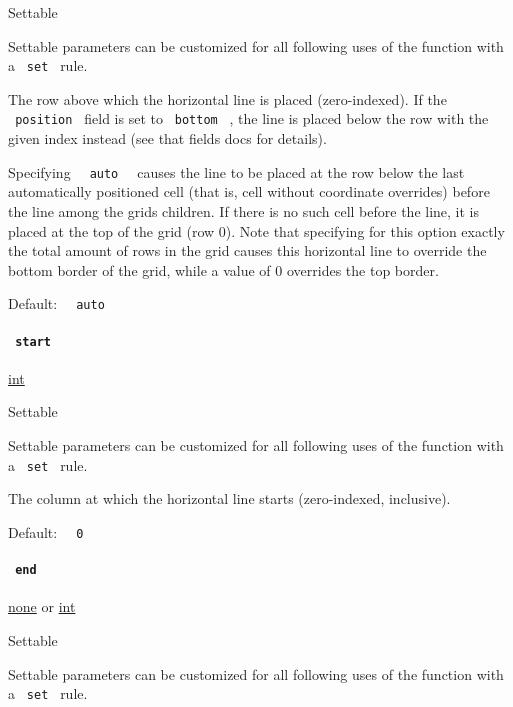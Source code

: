 {{ Settable }}

\label{definitions-hline-y-settable-tooltip}
Settable parameters can be customized for all following uses of the
function with a \texttt{\ set\ } rule.

The row above which the horizontal line is placed (zero-indexed). If the
\texttt{\ position\ } field is set to \texttt{\ bottom\ } , the line is
placed below the row with the given index instead (see that
field\textquotesingle s docs for details).

Specifying \texttt{\ }{\texttt{\ auto\ }}\texttt{\ } causes the line to
be placed at the row below the last automatically positioned cell (that
is, cell without coordinate overrides) before the line among the
grid\textquotesingle s children. If there is no such cell before the
line, it is placed at the top of the grid (row 0). Note that specifying
for this option exactly the total amount of rows in the grid causes this
horizontal line to override the bottom border of the grid, while a value
of 0 overrides the top border.

Default: \texttt{\ }{\texttt{\ auto\ }}\texttt{\ }

\paragraph{\texorpdfstring{\texttt{\ start\ }}{ start }}\label{definitions-hline-start}

\href{/docs/reference/foundations/int/}{int}

{{ Settable }}

\label{definitions-hline-start-settable-tooltip}
Settable parameters can be customized for all following uses of the
function with a \texttt{\ set\ } rule.

The column at which the horizontal line starts (zero-indexed,
inclusive).

Default: \texttt{\ }{\texttt{\ 0\ }}\texttt{\ }

\paragraph{\texorpdfstring{\texttt{\ end\ }}{ end }}\label{definitions-hline-end}

\href{/docs/reference/foundations/none/}{none} {or}
\href{/docs/reference/foundations/int/}{int}

{{ Settable }}

\label{definitions-hline-end-settable-tooltip}
Settable parameters can be customized for all following uses of the
function with a \texttt{\ set\ } rule.

